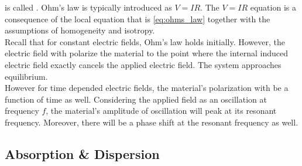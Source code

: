 \documentclass{article}
\begin{document}
 is called . Ohm's law is typically introduced as $V = IR$. The $V = IR$ equation is a consequence of the local equation that is \cref{eq:ohms_law} together with the assumptions of homogeneity and isotropy. \\

Recall that for constant electric fields, Ohm's law holds initially. However, the electric field with polarize the material to the point where the internal induced electric field exactly cancels the applied electric field. The system approaches equilibrium. \\

However for time depended electric fields, the material's polarization with be a function of time as well. Considering the applied field as an oscillation at frequency $f$, the material's amplitude of oscillation will peak at its resonant frequency. Moreover, there will be a phase shift at the resonant frequency as well.

\subsection{Absorption \& Dispersion}
\end{document}
